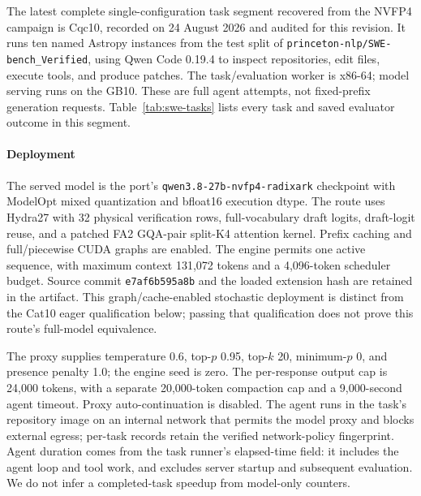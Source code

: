 The latest complete single-configuration task segment recovered from the NVFP4 campaign is Cqc10, recorded on 24 August 2026 and audited for this revision. It runs ten named Astropy instances from the test split of \texttt{princeton-nlp/SWE-bench\_Verified}, using Qwen Code 0.19.4 to inspect repositories, edit files, execute tools, and produce patches. The task/evaluation worker is x86-64; model serving runs on the GB10. These are full agent attempts, not fixed-prefix generation requests. Table~\ref{tab:swe-tasks} lists every task and saved evaluator outcome in this segment.

\paragraph{Deployment}
The served model is the port's \texttt{qwen3.8-27b-nvfp4-radixark} checkpoint with ModelOpt mixed quantization and bfloat16 execution dtype. The route uses Hydra27 with 32 physical verification rows, full-vocabulary draft logits, draft-logit reuse, and a patched FA2 GQA-pair split-K4 attention kernel. Prefix caching and full/piecewise CUDA graphs are enabled. The engine permits one active sequence, with maximum context 131,072 tokens and a 4,096-token scheduler budget. Source commit \texttt{e7af6b595a8b} and the loaded extension hash are retained in the artifact. This graph/cache-enabled stochastic deployment is distinct from the Cat10 eager qualification below; passing that qualification does not prove this route's full-model equivalence.

The proxy supplies temperature 0.6, top-$p$ 0.95, top-$k$ 20, minimum-$p$ 0, and presence penalty 1.0; the engine seed is zero. The per-response output cap is 24,000 tokens, with a separate 20,000-token compaction cap and a 9,000-second agent timeout. Proxy auto-continuation is disabled. The agent runs in the task's repository image on an internal network that permits the model proxy and blocks external egress; per-task records retain the verified network-policy fingerprint. Agent duration comes from the task runner's elapsed-time field: it includes the agent loop and tool work, and excludes server startup and subsequent evaluation. We do not infer a completed-task speedup from model-only counters.

